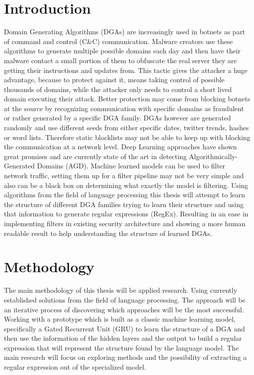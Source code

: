 \documentclass[a4paper, 12pt]{article}
\begin{document}
\section{Introduction}
Domain Generating Algorithms (DGAs) are increasingly used in botnets as part of
command and control (C\&C) communication. Malware creators use these algorithms
to generate multiple possible domains each day and then have their malware
contact a small portion of them to obfuscate the real server they are getting
their instructions and updates from. This tactic gives the attacker a huge
advantage, because to protect against it, means taking control of possible thousands
of domains, while the attacker only needs to control a short lived domain
executing their attack. Better protection may come from blocking
botnets at the source by recognizing communication with specific domains as
fraudulent or rather generated by a specific DGA family. DGAs however are
generated randomly and use different seeds from either specific dates, twitter
trends, hashes or word lists. Therefore static blocklists may not be able to
keep up with blocking the communication at a network level. Deep Learning
approaches have shown great promises and are currently state of the art in
detecting Algorithmically-Generated Domains (AGD). 
Machine learned models can be used to filter network traffic, setting them up for a filter pipeline
may not be very simple and also can be a black box on determining what exactly the model is
filtering.
Using algorithms from the field of language processing this thesis will attempt to learn the
structure of different DGA families trying to learn their structure and using that information to
generate regular expressions (RegEx). Resulting in an ease in implementing filters in existing
security architecture and showing a more human readable result to help understanding the structure
of learned DGAs.

\section{Methodology}
The main methodology of this thesis will be applied research. Using currently established solutions
from the field of language processing. The approach will be an iterative process of discovering
which approaches will be the most successful. Working with a prototype which is built as a classic
machine learning model, specifically a Gated Recurrent Unit (GRU) to learn the structure of a DGA
and then use the information of the hidden layers and the output to build a regular expression that
will represent the structure found by the language model. The main research will focus on exploring
methods and the possibility of extracting a regular expression out of the specialized model. 
\end{document}
